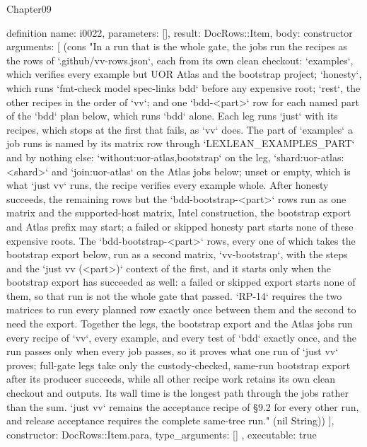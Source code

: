 \begin{lexlean}{Chapter09}
\begin{semanticmodule}
definition{
  name: i0022,
  parameters: [],
  result: DocRows::Item,
  body: constructor{
    arguments: [
      (cons "In a run that is the whole gate, the jobs run the recipes as the rows of `.github/vv-rows.json`, each from its own clean checkout: `examples`, which verifies every example but UOR Atlas and the bootstrap project; `honesty`, which runs `fmt-check model spec-links bdd` before any expensive root; `rest`, the other recipes in the order of `vv`; and one `bdd-<part>` row for each named part of the `bdd` plan below, which runs `bdd` alone. Each leg runs `just` with its recipes, which stops at the first that fails, as `vv` does. The part of `examples` a job runs is named by its matrix row through `LEXLEAN_EXAMPLES_PART` and by nothing else: `without:uor-atlas,bootstrap` on the leg, `shard:uor-atlas:<shard>` and `join:uor-atlas` on the Atlas jobs below; unset or empty, which is what `just vv` runs, the recipe verifies every example whole. After honesty succeeds, the remaining rows but the `bdd-bootstrap-<part>` rows run as one matrix and the supported-host matrix, Intel construction, the bootstrap export and Atlas prefix may start; a failed or skipped honesty part starts none of these expensive roots. The `bdd-bootstrap-<part>` rows, every one of which takes the bootstrap export below, run as a second matrix, `vv-bootstrap`, with the steps and the `just vv (<part>)` context of the first, and it starts only when the bootstrap export has succeeded as well: a failed or skipped export starts none of them, so that run is not the whole gate that passed. `RP-14` requires the two matrices to run every planned row exactly once between them and the second to need the export. Together the legs, the bootstrap export and the Atlas jobs run every recipe of `vv`, every example, and every test of `bdd` exactly once, and the run passes only when every job passes, so it proves what one run of `just vv` proves; full-gate legs take only the custody-checked, same-run bootstrap export after its producer succeeds, while all other recipe work retains its own clean checkout and outputs. Its wall time is the longest path through the jobs rather than the sum. `just vv` remains the acceptance recipe of §9.2 for every other run, and release acceptance requires the complete same-tree run." (nil String))
    ],
    constructor: DocRows::Item.para,
    type_arguments: []
  },
  executable: true
}


\end{semanticmodule}
\end{lexlean}
